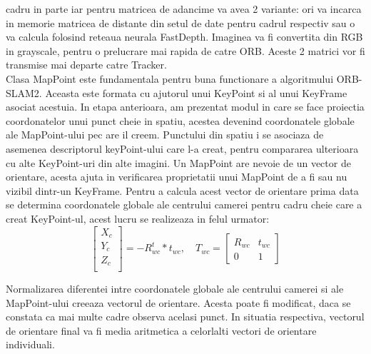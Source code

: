 \documentclass[12pt,a4paper]{report}
\begin{document}
cadru in parte iar pentru matricea de adancime va avea 2 variante: ori va incarca in memorie 
matricea de distante din setul de date pentru cadrul respectiv sau o va calcula folosind 
reteaua neurala FastDepth. Imaginea va fi convertita din RGB in grayscale, pentru o 
prelucrare mai rapida de catre ORB. Aceste 2 matrici vor fi transmise mai departe 
catre Tracker. \\
Clasa MapPoint este fundamentala pentru buna functionare a algoritmului ORB-SLAM2. Aceasta este 
formata cu ajutorul unui KeyPoint si al unui KeyFrame asociat acestuia. In etapa anterioara, 
am prezentat modul in care se face proiectia coordonatelor unui punct cheie in spatiu, acestea 
devenind coordonatele globale ale MapPoint-ului pec are il creem. Punctului din spatiu 
i se asociaza de asemenea descriptorul keyPoint-ului care l-a creat, pentru compararea ulterioara 
cu alte KeyPoint-uri din alte imagini. Un MapPoint are nevoie de un vector de orientare, acesta 
ajuta in verificarea proprietatii unui MapPoint de a fi sau nu vizibil dintr-un KeyFrame. Pentru a 
calcula acest vector de orientare prima data se determina coordonatele globale ale centrului camerei
pentru cadru cheie care a creat KeyPoint-ul, acest lucru se realizeaza in felul urmator:
\begin{equation}
    \begin{bmatrix}
        X_{c} \\
        Y_{c} \\
        Z_{c} \\
        \end{bmatrix} = -R_{wc}^t * t_{wc}, \quad{}  
        T_{wc} =     
     \begin{bmatrix}
            R_{wc} & t_{wc} \\
            0 & 1
        \end{bmatrix}
\end{equation} 

Normalizarea diferentei intre coordonatele globale ale centrului camerei si ale MapPoint-ului creeaza
vectorul de orientare. Acesta poate fi modificat, daca se constata ca mai multe cadre observa acelasi
punct. In situatia respectiva, vectorul de orientare final va fi media aritmetica a celorlalti vectori 
de orientare individuali.
\end{document}
